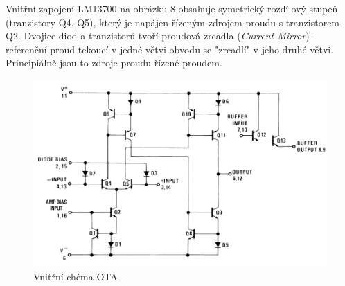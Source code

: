 \documentclass[twoside]{article}
\begin{document}
\noindent Vnitřní zapojení LM13700 na obrázku 8 obsahuje symetrický rozdílový stupeň (tranzistory Q4, Q5), který je napájen řízeným zdrojem proudu s tranzistorem Q2. Dvojice diod a tranzistorů tvoří proudová zrcadla (\textit{Current Mirror}) - referenční proud tekoucí v jedné větvi obvodu se "zrcadlí" v jeho druhé větvi. Principiálně jsou to zdroje proudu řízené proudem. 
\begin{figure}[H]
\centering
\includegraphics[scale=0.75]{image5.png}
\caption{Vnitřní chéma OTA \cite{6}}
\end{figure}
\end{document}
